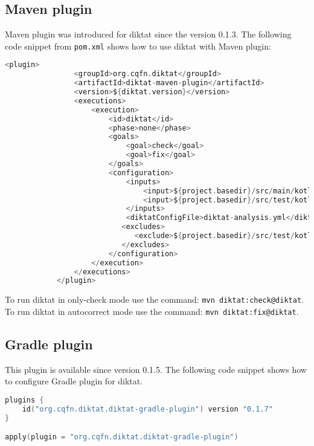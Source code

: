 \subsection{Maven plugin}
Maven plugin was introduced for diktat since the version 0.1.3. The following code snippet from \texttt{pom.xml} shows how to use diktat with Maven plugin:
\begin{lstlisting}[caption={DiKTat with Maven plugin}, label={lst:maven}, language=Kotlin]
          <plugin>
                <groupId>org.cqfn.diktat</groupId>
                <artifactId>diktat-maven-plugin</artifactId>
                <version>${diktat.version}</version>
                <executions>
                    <execution>
                        <id>diktat</id>
                        <phase>none</phase>
                        <goals>
                            <goal>check</goal>
                            <goal>fix</goal>
                        </goals>
                        <configuration>
                            <inputs>
                                <input>${project.basedir}/src/main/kotlin</input>
                                <input>${project.basedir}/src/test/kotlin</input>
                            </inputs>
                            <diktatConfigFile>diktat-analysis.yml</diktatConfigFile>
                           <excludes>
                              <exclude>${project.basedir}/src/test/kotlin/excluded</exclude>
                           </excludes>
                        </configuration>
                    </execution>
                </executions>
            </plugin>
\end{lstlisting}

To run diktat in only-check mode use the command: \texttt{mvn diktat:check@diktat}. To run diktat in autocorrect mode use the command: \texttt{mvn diktat:fix@diktat}.


\subsection{Gradle plugin}
This plugin is available since version 0.1.5. The following code snippet shows how to configure Gradle plugin for diktat.

\begin{lstlisting}[caption={DiKTat with Gradle plugin}, label={lst:gradle1}, language=Kotlin]
plugins {
    id("org.cqfn.diktat.diktat-gradle-plugin") version "0.1.7"
}

apply(plugin = "org.cqfn.diktat.diktat-gradle-plugin")
\end{lstlisting}

